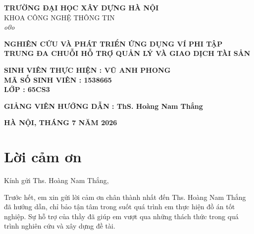 \documentclass[a4paper]{report}
\begin{document}
\begin{titlepage}
    \begin{center}
        
        \textbf{TRƯỜNG ĐẠI HỌC XÂY DỰNG HÀ NỘI}\\
        KHOA CÔNG NGHỆ THÔNG TIN\\
        \textit{o0o}
        \vspace{2cm}
        \vspace{1cm}
        \vspace{3cm}
        
        
        \textbf{\Large NGHIÊN CỨU VÀ PHÁT TRIỂN ỨNG DỤNG VÍ PHI TẬP TRUNG ĐA CHUỖI HỖ TRỢ QUẢN LÝ VÀ GIAO DỊCH TÀI SẢN}\\
        
      
        \vspace{2cm}
    
         \textbf{\normalsize SINH VIÊN THỰC HIỆN : VŨ ANH PHONG}\\
    \textbf{\normalsize MÃ SỐ SINH VIÊN : 1538665}\\
    \textbf{\normalsize LỚP : 65CS3}\\
    
    \vspace{2cm}
    
    \textbf{\normalsize GIẢNG VIÊN HƯỚNG DẪN : ThS. Hoàng Nam Thắng}
        
        \vspace{2cm}
        \textbf{HÀ NỘI, THÁNG 7 NĂM 2026}
    \end{center}
\end{titlepage}

\newpage
\tableofcontents

\newpage

\newpage

\chapter*{Lời cảm ơn}
\vspace{1cm}
Kính gửi Ths. Hoàng Nam Thắng,

\vspace{0.5cm}
Trước hết, em xin gửi lời cảm ơn chân thành nhất đến Ths. Hoàng Nam Thắng đã hướng dẫn, chỉ bảo tận tâm trong suốt quá trình em thực hiện đồ án tốt nghiệp. Sự hỗ trợ của thầy đã giúp em vượt qua những thách thức trong quá trình nghiên cứu và xây dựng đề tài.
\end{document}
